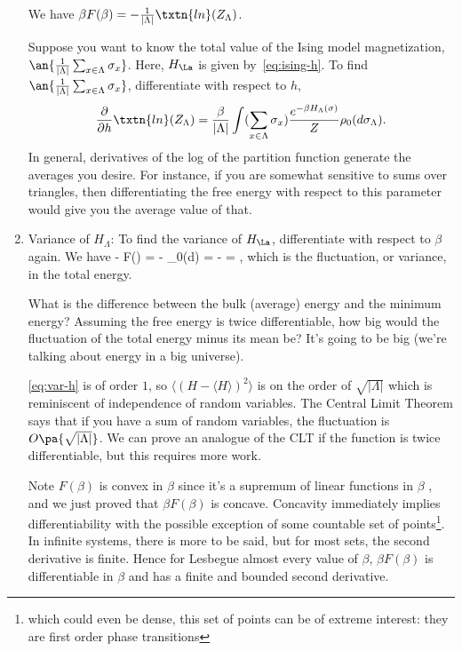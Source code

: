 \begin{enumerate}
We have $\beta F(\beta) = -\frac{1}{|\Lambda|}\txtn{ln}(Z_{\Lambda})$. 

Suppose you want to know the total value of the Ising model magnetization,  $\an{ \frac{1}{|\Lambda|} \sum_{x \in \Lambda} \sigma_x }$. 
Here, $H_\La$ is given by~\eqref{eq:ising-h}. To find $\an{ \frac{1}{|\Lambda|} \sum_{x \in \Lambda} \sigma_x }$,  
differentiate with respect to $h$, 
\[\frac{\partial}{\partial h}\txtn{ln}(Z_{\Lambda}) = \frac{\beta}{|\Lambda|} \int (\sum_{x \in \Lambda} \sigma_x) \frac{e^{-\beta H_{\Lambda}(\sigma)}}{Z} \rho_0(d\sigma_{\Lambda}).\] 
In general, derivatives of the log of the partition function generate the averages you desire. For instance, if you are somewhat sensitive to sums over triangles, then differentiating the free energy with respect to this parameter would give you the average value of that. 

\item Variance of $H_{\Lambda}$: To find the variance of $H_{\La}$, differentiate with respect to $\beta$ again. We have 
-  \beta F(\beta) = - \frac{\partial}{\partial\beta} \int {}  \rho_0(d\sigma) = -  = ,
\eeq
which is the fluctuation, or variance, in the total energy. 

What is the difference between the bulk (average) energy and the minimum energy? Assuming the free energy is twice differentiable, how big would the fluctuation of the total energy minus its mean be? It's going to be big (we're talking about energy in a big universe). 

\eqref{eq:var-h} is of order $1$, so $\langle (H - \langle H \rangle)^2\rangle$ is on the order of $\sqrt{|\Lambda|}$ which is reminiscent of independence of random variables. 
The Central Limit Theorem says that if you have a sum of random variables, the fluctuation is  $O\pa{\sqrt{|\Lambda|}}$. We can prove an analogue of the CLT if the function is twice differentiable, but this requires more work. 

Note $F(\beta)$ is convex in $\beta$ since it's a supremum of linear functions in $\beta$ , and we just proved that $\beta F(\beta)$ is concave. Concavity immediately implies differentiability with the possible exception of some countable set of points\footnote{which could even be dense, this set of points can be of extreme interest: they are first order phase transitions}. In infinite systems, there is more to be said, but for most sets, the second derivative is finite. Hence for Lesbegue almost every value of $\beta$, $\beta F(\beta)$ is differentiable in $\beta$ and has a finite and bounded second derivative. 

\end{enumerate}

